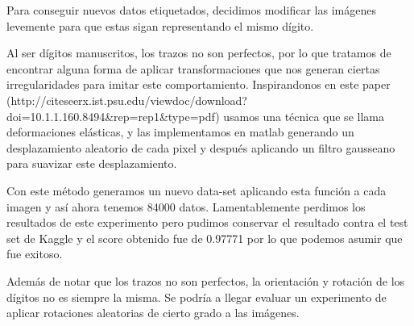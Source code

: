 Para conseguir nuevos datos etiquetados, decidimos modificar las imágenes levemente para que estas sigan representando el mismo dígito.

Al ser dígitos manuscritos, los trazos no son perfectos, por lo que tratamos de encontrar alguna forma de aplicar transformaciones que nos generan ciertas irregularidades para imitar este comportamiento. Inspirandonos en este paper (http://citeseerx.ist.psu.edu/viewdoc/download?doi=10.1.1.160.8494\&rep=rep1\&type=pdf)
usamos una técnica que se llama deformaciones elásticas, y las implementamos en matlab generando un desplazamiento aleatorio de cada pixel y después aplicando un filtro gausseano para suavizar este desplazamiento. 

Con este método generamos un nuevo data-set aplicando esta función a cada imagen y así ahora tenemos 84000 datos. Lamentablemente perdimos los resultados de este experimento pero pudimos conservar el resultado contra el test set de Kaggle y el score obtenido fue de 0.97771 por lo que podemos asumir que fue exitoso.

Además de notar que los trazos no son perfectos, la orientación y rotación de los dígitos no es siempre la misma. Se podría a llegar evaluar un experimento de aplicar rotaciones aleatorias de cierto grado a las imágenes.

